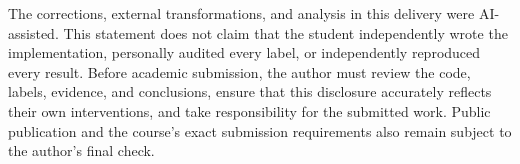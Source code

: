 \documentclass[sigconf]{acmart}
\begin{document}
The corrections, external transformations, and analysis in this delivery were
AI-assisted. This statement does not claim that the student independently wrote
the implementation, personally audited every label, or independently reproduced
every result. Before academic submission, the author must review the code,
labels, evidence, and conclusions, ensure that this disclosure accurately
reflects their own interventions, and take responsibility for the submitted
work. Public publication and the course's exact submission requirements also
remain subject to the author's final check.

\clearpage


\end{document}
